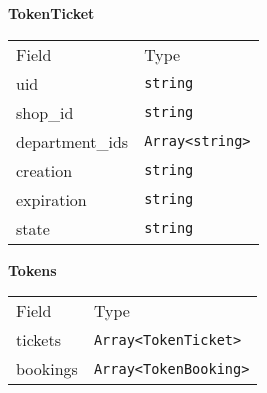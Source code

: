     \begin{table}[H]
    \centering
    \textbf{TokenTicket}\\
    \everyrow{\tabucline[0.5pt]-}
    \begin{tabu} to 0.55\textwidth {|X|X|} \hline
    Field & Type \\
    uid & \texttt{string} \\
shop\_id & \texttt{string} \\
department\_ids & \texttt{Array<string>} \\
creation & \texttt{string} \\
expiration & \texttt{string} \\
state & \texttt{string} \\
\end{tabu}
\end{table}


    \begin{table}[H]
    \centering
    \textbf{Tokens}\\
    \everyrow{\tabucline[0.5pt]-}
    \begin{tabu} to 0.55\textwidth {|X|X|} \hline
    Field & Type \\
    tickets & \texttt{Array<TokenTicket>} \\
bookings & \texttt{Array<TokenBooking>} \\
\end{tabu}
\end{table}


